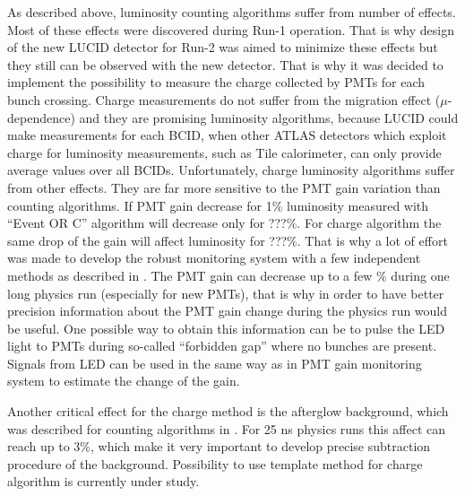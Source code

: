 As described above, luminosity counting algorithms suffer from number of effects. Most of these effects were discovered during Run-1 operation.
That is why design of the new LUCID detector for Run-2 was aimed to minimize these effects but they still can be observed with the new detector.
That is why it was decided to implement the possibility to measure the charge collected by PMTs for each bunch crossing.
Charge measurements do not suffer from the migration effect ($\mu$-dependence) and they are promising luminosity algorithms, because
LUCID could make measurements for each BCID, when other ATLAS detectors which exploit charge for luminosity measurements, such as Tile calorimeter, 
can only provide average values over all BCIDs. Unfortunately, charge luminosity algorithms suffer from other effects.
They are far more sensitive to the PMT gain variation than counting algorithms.
If PMT gain decrease for 1$\%$ luminosity measured with ``Event OR C'' algorithm will decrease only for ???$\%$.
For charge algorithm the same drop of the gain will affect luminosity for ???$\%$.
That is why a lot of effort was made to develop the robust monitoring system with a few independent methods as described in .
The PMT gain can decrease up to a few $\%$ during one long physics run (especially for new PMTs), that is why in order to have better precision information about the PMT gain change during the physics run would be useful.
One possible way to obtain this information can be to pulse the LED light to PMTs during so-called ``forbidden gap'' where no bunches are present.
Signals from LED can be used in the same way as in PMT gain monitoring system to estimate the change of the gain.

Another critical effect for the charge method is the afterglow background, which was described for counting algorithms in .
For 25 ns physics runs this affect can reach up to 3$\%$, which make it very important to develop precise subtraction procedure of the background.
Possibility to use template method for charge algorithm is currently under study.



